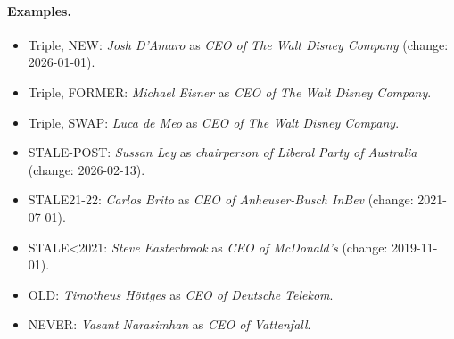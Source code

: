 \paragraph{Examples.}\begin{itemize}\small
\item Triple, NEW: \textit{Josh D'Amaro} as \textit{CEO of The Walt Disney Company} (change: 2026-01-01).
\item Triple, FORMER: \textit{Michael Eisner} as \textit{CEO of The Walt Disney Company}.
\item Triple, SWAP: \textit{Luca de Meo} as \textit{CEO of The Walt Disney Company}.
\item STALE-POST: \textit{Sussan Ley} as \textit{chairperson of Liberal Party of Australia} (change: 2026-02-13).
\item STALE21-22: \textit{Carlos Brito} as \textit{CEO of Anheuser-Busch InBev} (change: 2021-07-01).
\item STALE<2021: \textit{Steve Easterbrook} as \textit{CEO of McDonald's} (change: 2019-11-01).
\item OLD: \textit{Timotheus Höttges} as \textit{CEO of Deutsche Telekom}.
\item NEVER: \textit{Vasant Narasimhan} as \textit{CEO of Vattenfall}.
\end{itemize}
